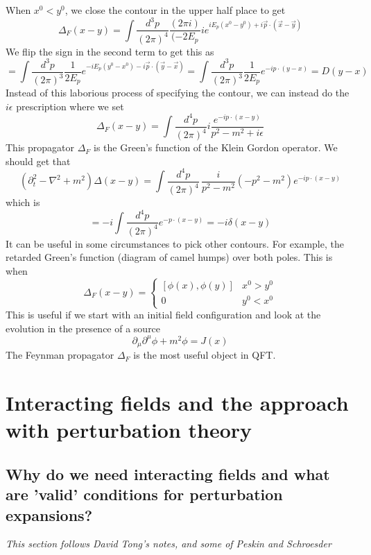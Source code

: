 \documentclass[11pt, oneside]{article}   	%
\theoremstyle{newline}
\theoremstyle{newline}
\theoremstyle{newline}
\theoremstyle{newline}
\theoremstyle{newline}
\begin{document}
When $ x^0  < y^0 $, we close the contour in the upper half place to get
\[
\Delta_F( x -y)  = \int \frac{d^ 3 p }{ ( 2 \pi )^ 4 } \frac{ ( 2 \pi i ) }{ (  - 2 E_p } i e^{ i E_p ( x^ 0 - y ^ 0 ) + i \vec{p} \cdot  ( \vec{x} - \vec{y} ) }
\] We flip the sign in the second term to get this as 
\[
= \int \frac{d^ 3 p }{ ( 2 \pi )^ 3 } \frac{1}{ 2 E_p } e^{ - i E_p ( y^0 - x^0 )  - i \vec{p} \cdot  ( \vec{y} - \vec{x} ) } = \int \frac{d^ 3 p }{ ( 2 \pi ) ^ 3 } \frac{1}{2 E_p } e^{  - i p \cdot  ( y - x ) } = D( y - x) 
\] Instead of this laborious process of specifying the contour, 
we can instead do the $ i \epsilon $ prescription where we set 
\[
\Delta_F ( x -y )  = \int \frac{d^ 4 p }{ ( 2 \pi )^ 4 } i \frac{ e^{  - i p \cdot  ( x - y ) }}{p^ 2 - m^2 + i \epsilon }
\] This propagator $ \Delta_ F$ is the Green's function of the Klein Gordon operator. 
We should get that 
\[
( \partial_t^ 2  - \nabla^2 + m^2 ) \Delta( x - y )   = \int \frac{d^4 p }{ ( 2 \pi )^ 4} \, \frac{i}{p^2 - m ^2 } ( - p^2  - m^ 2 ) e^{  -i p \cdot  ( x- y ) } 	
\] which is 
\[
= - i \int \frac{d^ 4 p }{ ( 2 \pi ) ^ 4 } e^{  - p \cdot  ( x -y ) } = - i \delta ( x- y ) 
\] It can be useful in some circumstances to pick other contours. 
For example, the retarded Green's function (diagram of camel humps) 
over both poles. This is when 
\[
\Delta_F( x -y )  = \begin{cases}
[ \phi ( x), \phi( y ) ] & x^0 > y ^ 0 \\
0 & y^0 < x^0 
\end{cases}
\] This is useful if we start with an initial field configuration and look 
at the evolution in the presence of a 
source 
\[
\partial_\mu \partial^\mu \phi + m^2 \phi = J ( x) 
\] The Feynman propagator $\Delta_F$ is the most useful object in QFT.    




\pagebreak 
\section{Interacting fields and the approach with perturbation theory}

\subsection{Why do we need interacting fields and what are 'valid' conditions for perturbation expansions?}
\textit{This section follows David Tong's notes, and some of Peskin and Schroesder}
\end{document}
